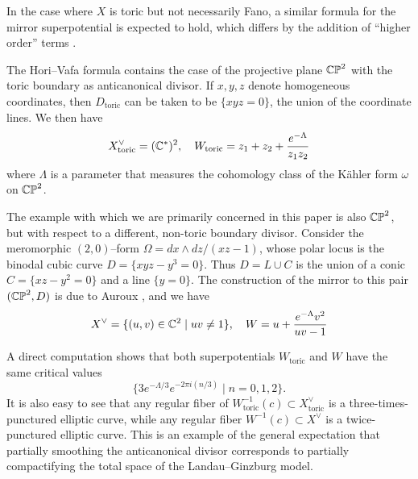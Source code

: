 \documentclass[12pt]{amsart}
\begin{document}
 In the case
where $X$ is toric but not necessarily Fano, a similar formula for the
mirror superpotential is expected to hold, which differs by the
addition of ``higher order'' terms \cite[Theorems 4.5, 4.6]{fooo-toric-I}.


The Hori--Vafa formula contains the case of the projective plane
$\mathbb{CP}^2$ with the toric boundary as anticanonical divisor. If $x,y,z$
denote homogeneous coordinates, then $D_{\text{toric}}$ can be taken to be
$\{xyz=0\}$, the union of the coordinate lines. We then have
\begin{equation}
  \label{eq:toric-lg-model}
    X^\vee_{\text{toric}} = (\mathbb{C}^*)^2, \quad
    W_{\text{toric}} = z_1+z_2+\frac{e^{-\Lambda}}{z_1z_2}
\end{equation}
where $\Lambda$ is a parameter that measures the cohomology class of
the K\"{a}hler form $\omega$ on $\mathbb{CP}^2$.

The example with which we are primarily concerned in this paper is
also $\mathbb{CP}^2$, but with respect to a different, non-toric boundary
divisor. Consider the meromorphic $(2,0)$--form $\Omega = dx\wedge dz
/ (xz-1)$, whose polar locus is the binodal cubic curve $D = \{xyz-y^3
= 0\}$. Thus $D = L \cup C$ is the union of a conic $C = \{xz-y^2 =
0\}$ and a line $\{y=0\}$. The construction of the mirror to this pair
$(\mathbb{CP}^2,D)$ is due to Auroux \cite{auroux07}, and we have
\begin{equation}
  \label{eq:main-lg-model}
  \begin{split}
    X^\vee = \{(u,v) \in \mathbb{C}^2 \mid uv \neq 1\}, \quad
    W = u + \frac{e^{-\Lambda}v^2}{uv-1}
  \end{split}
\end{equation}

A direct computation shows that both superpotentials
$W_{\text{toric}}$ and $W$ have the same critical values
\begin{equation}
  \label{eq:W-crit-vals}
  \{3e^{-\Lambda/3}e^{-2\pi i (n/3)} \mid n = 0, 1, 2\}.
\end{equation}
It is also easy to see that any regular fiber of
$W_{\text{toric}}^{-1}(c) \subset X^\vee_{\text{toric}}$ is a
three-times-punctured elliptic curve, while any regular fiber
$W^{-1}(c) \subset X^\vee$ is a twice-punctured elliptic curve. This
is an example of the general expectation that partially smoothing the
anticanonical divisor corresponds to partially compactifying the total
space of the Landau--Ginzburg model.
\end{document}
